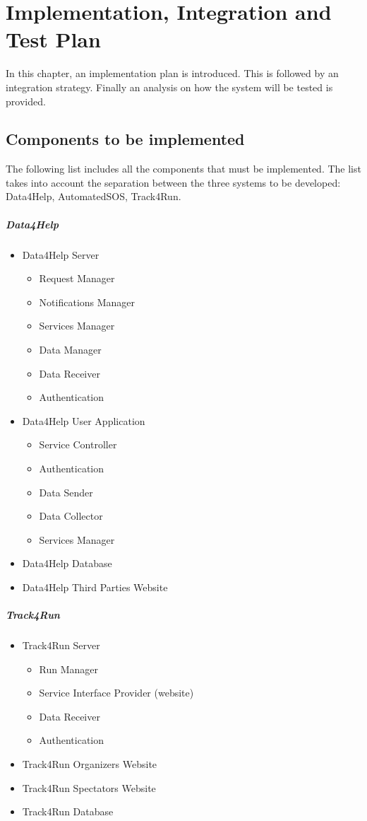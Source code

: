 \documentclass[../DD.tex]{subfiles}
\begin{document}
\chapter{Implementation, Integration and Test Plan}
In this chapter, an implementation plan is introduced. This is followed by an integration strategy. Finally an analysis on how the system will be tested is provided.

\section{Components to be implemented\label{sect:5.1}}
The following list includes all the components that must be implemented. The list takes into account the separation between the three systems to be developed: Data4Help, AutomatedSOS, Track4Run.
\paragraph{Data4Help}
\begin{itemize}
	\item{Data4Help Server}
	\begin{itemize}
		\item{Request Manager}
		\item{Notifications Manager}
		\item{Services Manager}
		\item{Data Manager}
		\item{Data Receiver}
		\item{Authentication}
	\end{itemize}
	\item{Data4Help User Application}
	\begin{itemize}
		\item{Service Controller}
		\item{Authentication}
		\item{Data Sender}
		\item{Data Collector}
		\item{Services Manager}
	\end{itemize}
	\item{Data4Help Database}
	\item{Data4Help Third Parties Website}
\end{itemize}
\paragraph{Track4Run}
\begin{itemize}
	\item{Track4Run Server}
	\begin{itemize}
		\item{Run Manager}
		\item{Service Interface Provider (website)}
		\item{Data Receiver}
		\item{Authentication}
	\end{itemize}
	\item{Track4Run Organizers Website}
	\item{Track4Run Spectators Website}
	\item{Track4Run Database}
\end{itemize}
\end{document}
